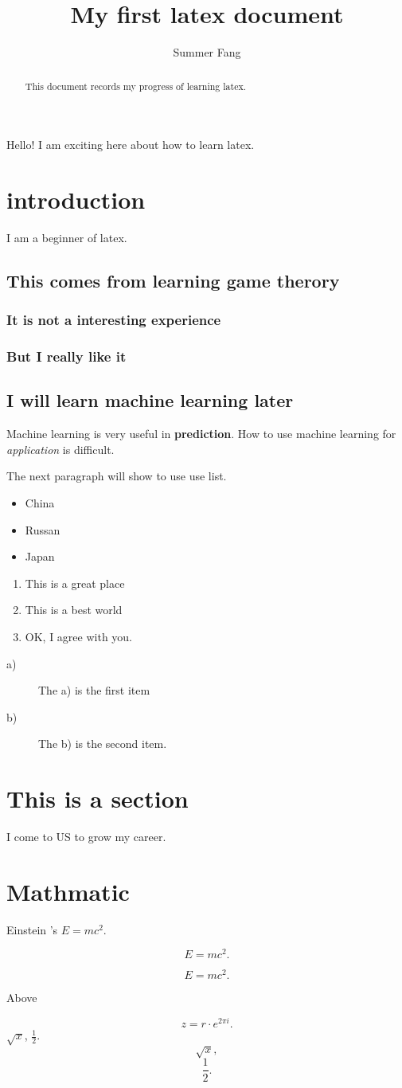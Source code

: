 \documentclass{article}
\begin{document}
\title{My first latex document}
\author{Summer Fang}
\maketitle

\begin{abstract}
This document records my progress of learning latex.
\end{abstract}

Hello! I am exciting here about how to learn latex.

\section{introduction}
I am a beginner of latex.

\subsection{This comes from learning game therory}
\subsubsection{It is not a interesting experience}
\subsubsection{But I really like it}
\subsection{I will learn machine learning later}
Machine learning is very useful in \textbf{prediction}. How to use machine learning for \textit{application} is difficult.

The next paragraph will show to use use list.

\begin{itemize}
	\item China
	\item Russan
	\item Japan
\end{itemize}

\begin{enumerate}
	\item This is a great place
	\item This is a best world
	\item OK, I agree with you.
\end{enumerate}

\begin{description}
	\item[a)] The a) is the first item
	\item[b)] The b) is the second item.
\end{description}
\section{This is a section}
I come to US to grow my career.

\section{Mathmatic}
Einstein 's $E=mc^2$.

\[ E=mc^2. \]

\begin{equation}
E=mc^2.
\end{equation}

Above

\[ z = r\cdot e^{2\pi i}. \]
$\sqrt{x}$, $\frac{1}{2}$.
\[ \sqrt{x}, \]
\[ \frac{1}{2}. \]
\end{document}
